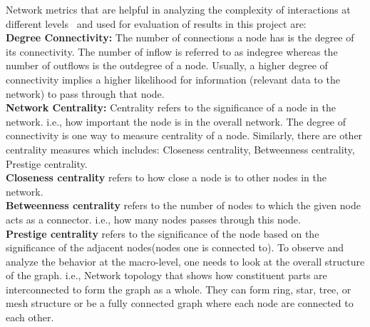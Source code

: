 Network metrics that are helpful in analyzing the complexity of interactions at
different levels~\cite{gkorou2014exploiting} and used for evaluation of results
in this project are: \\
\textbf{Degree Connectivity:} The number of connections a node has is the
degree of its connectivity. The number of inflow is referred to as indegree
whereas the number of outflows is the outdegree of a node. Usually, a higher
degree of connectivity implies a higher likelihood for information (relevant
data to the network) to pass through that node.\\
\textbf{Network Centrality:} Centrality refers to the significance of a node in
the network. i.e., how important the node is in the overall network. The degree
of connectivity is one way to measure centrality of a node. Similarly, there
are other centrality measures which includes: Closeness centrality,
Betweenness centrality, Prestige centrality.\\ 
\textbf{Closeness centrality} refers to how close a node is to other nodes in
the network.  \\
\textbf{Betweenness centrality} refers to the number of nodes to
which the given node acts as a connector. i.e., how many nodes passes through
this node.\\
\textbf{Prestige centrality} refers to the significance of the node
based on the significance of the adjacent nodes(nodes one is connected to).  To
observe and analyze the behavior at the macro-level, one needs to look at the
overall structure of the graph. i.e., Network topology that shows how
constituent parts are interconnected to form the graph as a whole. They can
form ring, star, tree, or mesh structure or be a fully connected graph where
each node are connected to each other. 

